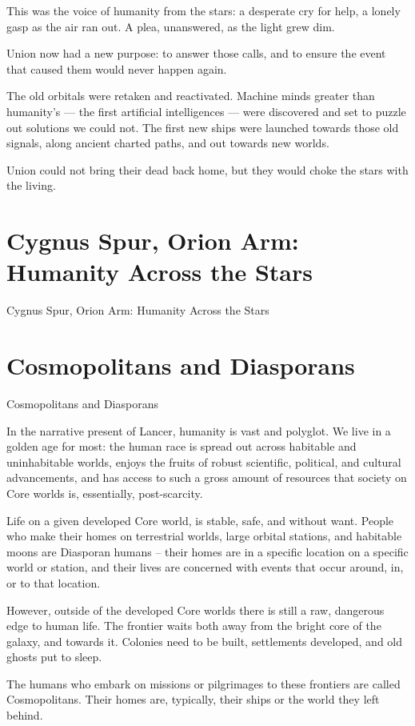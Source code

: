 This was the voice of humanity from the stars: a desperate cry for help, a lonely gasp as the air  
ran out. A plea, unanswered, as the light grew dim.  
 

Union now had a new purpose: to answer those calls, and to ensure the event that caused them  
would never happen again.
 

The old orbitals were retaken and reactivated. Machine minds greater than humanity’s — the first  
artificial intelligences — were discovered and set to puzzle out solutions we could not. The first  
new ships were launched towards those old signals, along ancient charted paths, and out  
towards new worlds. 
 

Union could not bring their dead back home, but they would choke the stars with the living.
                                           
\section{Cygnus Spur, Orion Arm: Humanity Across the Stars}

Cygnus Spur, Orion Arm: Humanity  
Across the Stars  
\section{Cosmopolitans and Diasporans}
Cosmopolitans and Diasporans  

In the narrative present of Lancer, humanity is vast and polyglot. We live in a golden age  
for most: the human race is spread out across habitable and uninhabitable worlds, enjoys the  
fruits of robust scientific, political, and cultural advancements, and has access to such a gross  
amount of resources that society on Core worlds is, essentially, post-scarcity. 
 

Life on a given developed Core world, is stable, safe, and without want. People who make their  
homes on terrestrial worlds, large orbital stations, and habitable moons are Diasporan humans --   
their homes are in a specific location on a specific world or station, and their lives are concerned  
with events that occur around, in, or to that location.  
 

However, outside of the developed Core worlds there is still a raw, dangerous edge to human life.  
The frontier waits both away from the bright core of the galaxy, and towards it. Colonies need to  
be built, settlements developed, and old ghosts put to sleep.
 

The humans who embark on missions or pilgrimages to these frontiers are called Cosmopolitans.  
Their homes are, typically, their ships or the world they left behind. 
 

